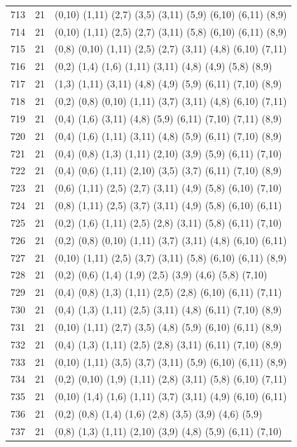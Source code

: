 \begin{appendix}
{\begin{longtable}{lll}
713& 21 & (0,10)  (1,11) (2,7)  (3,5)   (3,11)  (5,9)   (6,10)  (6,11)  (8,9)\\
714& 21 & (0,10)  (1,11) (2,5)  (2,7)   (3,11)  (5,8)   (6,10)  (6,11)  (8,9)\\
715& 21 & (0,8)   (0,10) (1,11) (2,5)   (2,7)   (3,11)  (4,8)   (6,10)  (7,11)\\
716& 21 & (0,2)   (1,4)  (1,6)  (1,11)  (3,11)  (4,8)   (4,9)   (5,8)   (8,9)\\
717& 21 & (1,3)   (1,11) (3,11) (4,8)   (4,9)   (5,9)   (6,11)  (7,10)  (8,9)\\
718& 21 & (0,2)   (0,8)  (0,10) (1,11)  (3,7)   (3,11)  (4,8)   (6,10)  (7,11)\\
719& 21 & (0,4)   (1,6)  (3,11) (4,8)   (5,9)   (6,11)  (7,10)  (7,11)  (8,9)\\
720& 21 & (0,4)   (1,6)  (1,11) (3,11)  (4,8)   (5,9)   (6,11)  (7,10)  (8,9)\\
721& 21 & (0,4)   (0,8)  (1,3)  (1,11)  (2,10)  (3,9)   (5,9)   (6,11)  (7,10)\\
722& 21 & (0,4)   (0,6)  (1,11) (2,10)  (3,5)   (3,7)   (6,11)  (7,10)  (8,9)\\
723& 21 & (0,6)   (1,11) (2,5)  (2,7)   (3,11)  (4,9)   (5,8)   (6,10)  (7,10)\\
724& 21 & (0,8)   (1,11) (2,5)  (3,7)   (3,11)  (4,9)   (5,8)   (6,10)  (6,11)\\
725& 21 & (0,2)   (1,6)  (1,11) (2,5)   (2,8)   (3,11)  (5,8)   (6,11)  (7,10)\\
726& 21 & (0,2)   (0,8)  (0,10) (1,11)  (3,7)   (3,11)  (4,8)   (6,10)  (6,11)\\
727& 21 & (0,10)  (1,11) (2,5)  (3,7)   (3,11)  (5,8)   (6,10)  (6,11)  (8,9)\\
728& 21 & (0,2)   (0,6)  (1,4)  (1,9)   (2,5)   (3,9)   (4,6)   (5,8)   (7,10)\\
729& 21 & (0,4)   (0,8)  (1,3)  (1,11)  (2,5)   (2,8)   (6,10)  (6,11)  (7,11)\\
730& 21 & (0,4)   (1,3)  (1,11) (2,5)   (3,11)  (4,8)   (6,11)  (7,10)  (8,9)\\
731& 21 & (0,10)  (1,11) (2,7)  (3,5)   (4,8)   (5,9)   (6,10)  (6,11)  (8,9)\\
732& 21 & (0,4)   (1,3)  (1,11) (2,5)   (2,8)   (3,11)  (6,11)  (7,10)  (8,9)\\
733& 21 & (0,10)  (1,11) (3,5)  (3,7)   (3,11)  (5,9)   (6,10)  (6,11)  (8,9)\\
734& 21 & (0,2)   (0,10) (1,9)  (1,11)  (2,8)   (3,11)  (5,8)   (6,10)  (7,11)\\
735& 21 & (0,10)  (1,4)  (1,6)  (1,11)  (3,7)   (3,11)  (4,9)   (6,10)  (6,11)\\
736& 21 & (0,2)   (0,8)  (1,4)  (1,6)   (2,8)   (3,5)   (3,9)   (4,6)   (5,9)\\
737& 21 & (0,8)   (1,3)  (1,11) (2,10)  (3,9)   (4,8)   (5,9)   (6,11)  (7,10)\\
\end{longtable}}

\end{appendix}
